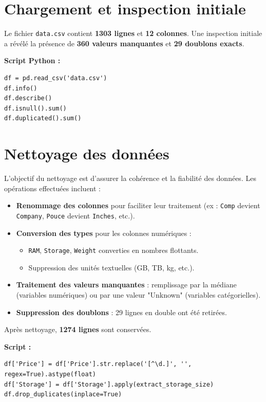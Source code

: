 \documentclass[12pt]{report}
\begin{document}
\section{Chargement et inspection initiale}

Le fichier \texttt{data.csv} contient \textbf{1303 lignes} et \textbf{12 colonnes}. Une inspection initiale a révélé la présence de \textbf{360 valeurs manquantes} et \textbf{29 doublons exacts}.

\textbf{Script Python :}
\begin{lstlisting}
df = pd.read_csv('data.csv')
df.info()
df.describe()
df.isnull().sum()
df.duplicated().sum()
\end{lstlisting}

\section{Nettoyage des données}

L’objectif du nettoyage est d’assurer la cohérence et la fiabilité des données. Les opérations effectuées incluent :

\begin{itemize}
    \item \textbf{Renommage des colonnes} pour faciliter leur traitement (ex : \texttt{Comp} devient \texttt{Company}, \texttt{Pouce} devient \texttt{Inches}, etc.).
    
    \item \textbf{Conversion des types} pour les colonnes numériques :
        \begin{itemize}
            \item \texttt{RAM}, \texttt{Storage}, \texttt{Weight} converties en nombres flottants.
            \item Suppression des unités textuelles (GB, TB, kg, etc.).
        \end{itemize}
    
    \item \textbf{Traitement des valeurs manquantes} : remplissage par la médiane (variables numériques) ou par une valeur "Unknown" (variables catégorielles).
    
    \item \textbf{Suppression des doublons} : 29 lignes en double ont été retirées.
\end{itemize}

Après nettoyage, \textbf{1274 lignes} sont conservées.

\textbf{Script :}
\begin{lstlisting}
df['Price'] = df['Price'].str.replace('[^\d.]', '', regex=True).astype(float)
df['Storage'] = df['Storage'].apply(extract_storage_size)
df.drop_duplicates(inplace=True)
\end{lstlisting}
\end{document}

